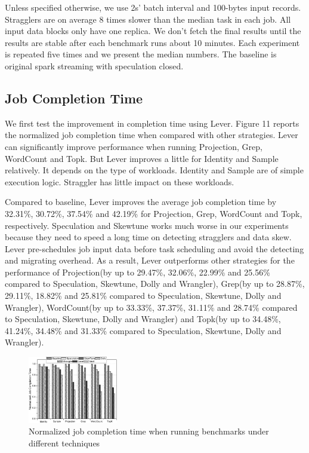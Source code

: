 \documentclass[10pt,conference,compsocconf,letterpaper]{IEEEtran}
\begin{document}
  Unless specified otherwise, we use 2s' batch interval and 100-bytes input records. Stragglers are on average 8 times slower than the median task in each job. All input data blocks only have one replica. We don't fetch the final results until the results are stable after each benchmark runs about 10 minutes. Each experiment is repeated five times and we present the median numbers. The baseline is original spark streaming with speculation closed.

\subsection{Job Completion Time}

  We first test the improvement in completion time using Lever. Figure 11 reports the normalized job completion time when compared with other strategies. Lever can significantly improve performance when running Projection, Grep, WordCount and Topk. But Lever improves a little for Identity and Sample relatively. It depends on the type of workloads. Identity and Sample are of simple execution logic. Straggler has little impact on these workloads.

  Compared to baseline, Lever improves the average job completion time by 32.31\%, 30.72\%, 37.54\% and 42.19\% for Projection, Grep, WordCount and Topk, respectively. Speculation and Skewtune works much worse in our experiments because they need to speed a long time on detecting stragglers and data skew. Lever pre-schedules job input data before task scheduling and avoid the detecting and migrating overhead. As a result, Lever outperforms other strategies for the performance of Projection(by up to 29.47\%, 32.06\%, 22.99\% and 25.56\% compared to Speculation, Skewtune, Dolly and Wrangler), Grep(by up to 28.87\%, 29.11\%, 18.82\% and 25.81\% compared to Speculation, Skewtune, Dolly and Wrangler), WordCount(by up to 33.33\%, 37.37\%, 31.11\% and 28.74\% compared to Speculation, Skewtune, Dolly and Wrangler) and Topk(by up to 34.48\%, 41.24\%, 34.48\% and 31.33\% compared to Speculation, Skewtune, Dolly and Wrangler).
  \begin{figure}[htbp]
    \centering
    \includegraphics[width=0.35\textwidth]{FigureJCT}
    \caption{Normalized job completion time when running benchmarks under different techniques}
    \label{Fig. 11:}
  \end{figure}
\end{document}
